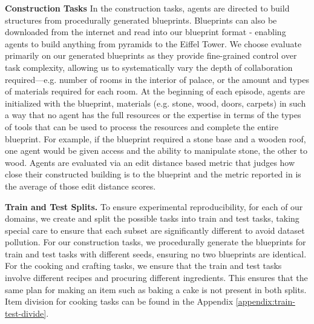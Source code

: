 \documentclass{article}
\begin{document}
\textbf{Construction Tasks} 
In the construction tasks, agents are directed to build structures from procedurally generated blueprints.
Blueprints can also be downloaded from the internet and read into our blueprint format - enabling agents to build anything from pyramids to the Eiffel Tower. 
We choose evaluate primarily on our generated blueprints as they provide fine-grained control over task complexity, allowing us to systematically vary the depth of collaboration required---e.g. number of rooms in the interior of palace, or the amount and types of materials required for each room.
At the beginning of each episode, agents are initialized with the blueprint, materials (e.g. stone, wood, doors, carpets) in such a way that no agent has the full resources or the expertise in terms of the types of tools that can be used to process the resources and complete the entire blueprint.
For example, if the blueprint required a stone base and a wooden roof, one agent would be given access and the ability to manipulate stone, the other to wood.
Agents are evaluated via an edit distance based metric that judges how close their constructed building is to the blueprint and the metric reported in  is the average of those edit distance scores.


\textbf{Train and Test Splits.}
To ensure experimental reproducibility, for each of our domains, we create and split the possible tasks into train and test tasks, taking special care to ensure that each subset are significantly different to avoid dataset pollution.
For our construction tasks, we procedurally generate the blueprints for train and test tasks with different seeds, ensuring no two blueprints are identical. 
For the cooking and crafting tasks, we ensure that the train and test tasks involve different recipes and procuring different ingredients.
This ensures that the same plan for making an item such as baking a cake is not present in both splits.
Item division for cooking tasks can be found in the Appendix \ref{appendix:train-test-divide}.
\end{document}
